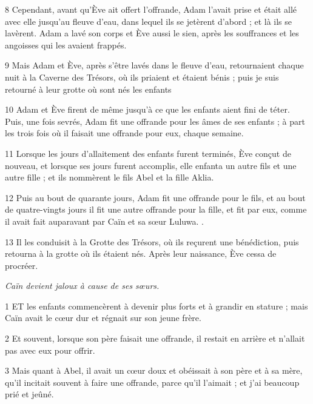 \par 8 Cependant, avant qu'Ève ait offert l'offrande, Adam l'avait prise et était allé avec elle jusqu'au fleuve d'eau, dans lequel ils se jetèrent d'abord ; et là ils se lavèrent. Adam a lavé son corps et Ève aussi le sien, après les souffrances et les angoisses qui les avaient frappés.

\par 9 Mais Adam et Ève, après s'être lavés dans le fleuve d'eau, retournaient chaque nuit à la Caverne des Trésors, où ils priaient et étaient bénis ; puis je suis retourné à leur grotte où sont nés les enfants

\par 10 Adam et Ève firent de même jusqu'à ce que les enfants aient fini de téter. Puis, une fois sevrés, Adam fit une offrande pour les âmes de ses enfants ; à part les trois fois où il faisait une offrande pour eux, chaque semaine.

\par 11 Lorsque les jours d'allaitement des enfants furent terminés, Ève conçut de nouveau, et lorsque ses jours furent accomplis, elle enfanta un autre fils et une autre fille ; et ils nommèrent le fils Abel et la fille Aklia.

\par 12 Puis au bout de quarante jours, Adam fit une offrande pour le fils, et au bout de quatre-vingts jours il fit une autre offrande pour la fille, et fit par eux, comme il avait fait auparavant par Caïn et sa sœur Luluwa. .

\par 13 Il les conduisit à la Grotte des Trésors, où ils reçurent une bénédiction, puis retourna à la grotte où ils étaient nés. Après leur naissance, Ève cessa de procréer.


\par \textit{Caïn devient jaloux à cause de ses sœurs.}

\par 1 ET les enfants commencèrent à devenir plus forts et à grandir en stature ; mais Caïn avait le cœur dur et régnait sur son jeune frère.

\par 2 Et souvent, lorsque son père faisait une offrande, il restait en arrière et n'allait pas avec eux pour offrir.

\par 3 Mais quant à Abel, il avait un cœur doux et obéissait à son père et à sa mère, qu'il incitait souvent à faire une offrande, parce qu'il l'aimait ; et j'ai beaucoup prié et jeûné.

